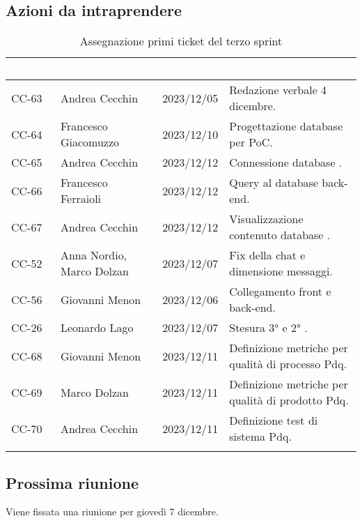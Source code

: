 \subsection{Azioni da intraprendere}
{
    \setlength{\tabcolsep}{10pt}
            \renewcommand{\arraystretch}{1.5}
            \begin{xltabular}{\textwidth}{| l | X | l | X |}
                 \hline
                 \textbf{\textcolor{white}{Codice }} & \textbf{\textcolor{white}{Assegnatario}} & \textbf{\textcolor{white}{Scadenza}} & \textbf{\textcolor{white}{Descrizione}} \\
                 \hline
                 \endhead
                 CC-63 & Andrea Cecchin & 2023/12/05 & Redazione verbale 4 dicembre. \\
                 \hline
                 CC-64 & Francesco Giacomuzzo & 2023/12/10 & Progettazione database per PoC. \\
                 \hline
                 CC-65 & Andrea Cecchin & 2023/12/12 & Connessione database . \\
                 \hline
                 CC-66 & Francesco Ferraioli & 2023/12/12 & Query al database back-end. \\
                 \hline
                 CC-67 & Andrea Cecchin & 2023/12/12 & Visualizzazione contenuto database . \\
                 \hline
                 CC-52 & Anna Nordio, Marco Dolzan& 2023/12/07 & Fix della chat e dimensione messaggi. \\
                 \hline
                 CC-56 & Giovanni Menon & 2023/12/06 & Collegamento front e back-end. \\
                 \hline
                 CC-26 & Leonardo Lago & 2023/12/07 & Stesura 3°  e 2° . \\
                 \hline
                 CC-68 & Giovanni Menon & 2023/12/11 & Definizione metriche per qualità di processo Pdq. \\
                 \hline
                 CC-69 & Marco Dolzan & 2023/12/11 & Definizione metriche per qualità di prodotto Pdq. \\
                 \hline
                 CC-70 & Andrea Cecchin & 2023/12/11 & Definizione test di sistema Pdq. \\
                 \hline
                  \caption{Assegnazione primi ticket del terzo sprint}
            \end{xltabular}
}


\subsection{Prossima riunione} \label{subsec:riunione}
Viene fissata una riunione per giovedì 7 dicembre.
